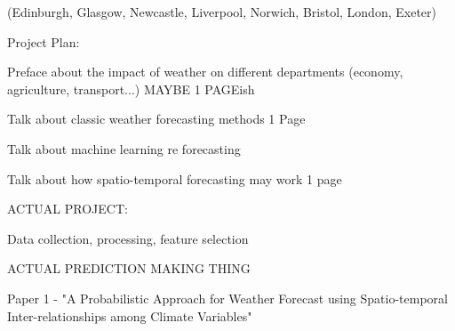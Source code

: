 \documentclass[13pt]{article}
\begin{document}
(Edinburgh, Glasgow, Newcastle, Liverpool, Norwich, Bristol, London, Exeter)



Project Plan:


Preface about the impact of weather on different departments (economy, agriculture, transport...) MAYBE 1 PAGEish


Talk about classic weather forecasting methods 1 Page

Talk about machine learning re forecasting 

Talk about how spatio-temporal forecasting may work 1 page


ACTUAL PROJECT:

Data collection, processing, feature selection


ACTUAL PREDICTION MAKING THING








Paper 1 - "A Probabilistic Approach for Weather Forecast using Spatio-temporal Inter-relationships among Climate Variables"
\end{document}
